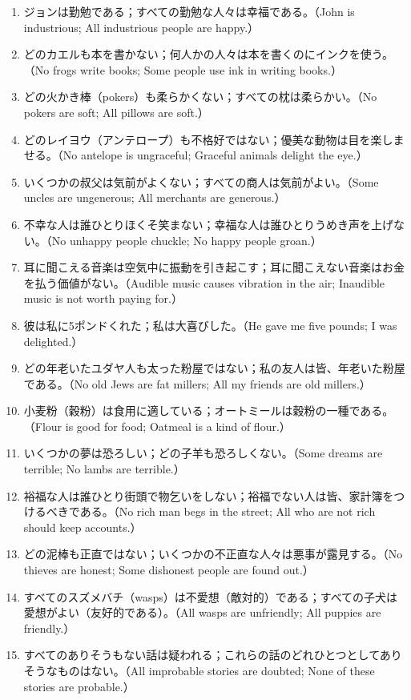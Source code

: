 \documentclass[a4paper,11pt,openany]{ltjsbook}
\begin{document}
\begin{enumerate}[label=\textbf{\arabic*.}]
\item ジョンは勤勉である；すべての勤勉な人々は幸福である。（John is industrious; All industrious people are happy.）
\item どのカエルも本を書かない；何人かの人々は本を書くのにインクを使う。（No frogs write books; Some people use ink in writing books.）
\item どの火かき棒（pokers）も柔らかくない；すべての枕は柔らかい。（No pokers are soft; All pillows are soft.）
\item どのレイヨウ（アンテロープ）も不格好ではない；優美な動物は目を楽しませる。（No antelope is ungraceful; Graceful animals delight the eye.）
\item いくつかの叔父は気前がよくない；すべての商人は気前がよい。（Some uncles are ungenerous; All merchants are generous.）
\item 不幸な人は誰ひとりほくそ笑まない；幸福な人は誰ひとりうめき声を上げない。（No unhappy people chuckle; No happy people groan.）
\item 耳に聞こえる音楽は空気中に振動を引き起こす；耳に聞こえない音楽はお金を払う価値がない。（Audible music causes vibration in the air; Inaudible music is not worth paying for.）
\item 彼は私に5ポンドくれた；私は大喜びした。（He gave me five pounds; I was delighted.）
\item どの年老いたユダヤ人も太った粉屋ではない；私の友人は皆、年老いた粉屋である。（No old Jews are fat millers; All my friends are old millers.）
\item 小麦粉（穀粉）は食用に適している；オートミールは穀粉の一種である。（Flour is good for food; Oatmeal is a kind of flour.）
\item いくつかの夢は恐ろしい；どの子羊も恐ろしくない。（Some dreams are terrible; No lambs are terrible.）
\item 裕福な人は誰ひとり街頭で物乞いをしない；裕福でない人は皆、家計簿をつけるべきである。（No rich man begs in the street; All who are not rich should keep accounts.）
\item どの泥棒も正直ではない；いくつかの不正直な人々は悪事が露見する。（No thieves are honest; Some dishonest people are found out.）
\item すべてのスズメバチ（wasps）は不愛想（敵対的）である；すべての子犬は愛想がよい（友好的である）。（All wasps are unfriendly; All puppies are friendly.）
\item すべてのありそうもない話は疑われる；これらの話のどれひとつとしてありそうなものはない。（All improbable stories are doubted; None of these stories are probable.）

\end{enumerate}
\end{document}
